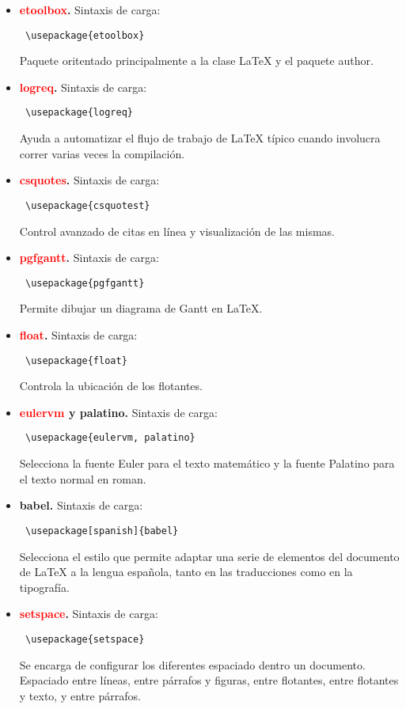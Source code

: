 \begin{itemize}
\begin{verbatim}
\end{verbatim} Reimplementación de los paquetes de referencias bibliográficas proporcionados por \LaTeX{} y BibTeX.
\item \textbf{\textcolor{red}{etoolbox}.}  Sintaxis de carga:  \begin{verbatim} \usepackage{etoolbox}
\end{verbatim} Paquete oritentado principalmente a la clase LaTeX y el paquete author.
\item \textbf{\textcolor{red}{logreq}.}  Sintaxis de carga:  \begin{verbatim} \usepackage{logreq}
\end{verbatim} Ayuda a automatizar el flujo de trabajo de LaTeX típico cuando involucra correr varias veces la compilación.
\item \textbf{\textcolor{red}{csquotes}.}  Sintaxis de carga:  \begin{verbatim} \usepackage{csquotest}
\end{verbatim} Control avanzado de citas en línea y visualización de las mismas.
\item \textbf{\textcolor{red}{pgfgantt}.}  Sintaxis de carga:  \begin{verbatim} \usepackage{pgfgantt}
\end{verbatim} Permite dibujar un diagrama de Gantt en LaTeX.
\item \textbf{\textcolor{red}{float}.}  Sintaxis de carga:  \begin{verbatim} \usepackage{float}
\end{verbatim} Controla la ubicación de los flotantes.
\item \textbf{ \textcolor{red}{eulervm} y palatino.}  Sintaxis de carga:  \begin{verbatim} \usepackage{eulervm, palatino}
\end{verbatim} Selecciona la fuente Euler para el texto matemático y la fuente Palatino para el texto normal en roman.
\item \textbf{ babel.}  Sintaxis de carga:  \begin{verbatim} \usepackage[spanish]{babel}
\end{verbatim} Selecciona el estilo que permite adaptar una serie de elementos del documento de \LaTeX{} a la lengua española, tanto en las traducciones como en la tipografía. 
\item \textbf{\textcolor{red}{setspace}.}  Sintaxis de carga:  \begin{verbatim} \usepackage{setspace}
\end{verbatim} Se encarga de configurar los diferentes espaciado dentro un documento. Espaciado entre líneas, entre párrafos y figuras, entre flotantes, entre flotantes y texto, y entre párrafos.

\end{itemize}
